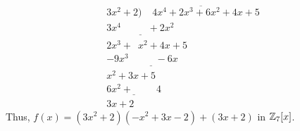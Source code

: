 \documentclass[../hw4]{subfiles}
\begin{document}
\begin{problem}
\begin{enumerate}[label=\alph*)]
\[\begin{array}{r}
			      3x^2 + 2 \big) \overline{ \phantom{aa} 4x^4+2x^3+6x^2+4x+5} \\
			      \underline{3x^4 \phantom{+0,x^3}+ 2x^2} \phantom{+0x+00}    \\
			      2x^3 +\phantom{0} x^2 + 4x + 5                              \\
			      \underline{-9x^3 \phantom{+0,x^2}- 6x\phantom{+00}}         \\
			      x^2 + 3x + 5                                                \\
			      \underline{6x^2+\phantom{+0x0} 4}                           \\
			      3x + 2
		      \end{array}
	      \]
	      Thus, $f(x)=(3x^2 + 2)(-x^2+3x-2)+(3x+2)$ in $\mathbb{Z}_7[x]$.
\end{enumerate}
\end{problem}

\end{document}

